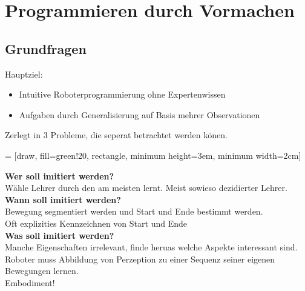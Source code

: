 

\section{Programmieren durch Vormachen}

\subsection{Grundfragen}
Hauptziel:
\begin{itemize}
\item Intuitive Roboterprogrammierung ohne Expertenwissen
\item Aufgaben durch Generalisierung auf Basis mehrer Observationen
\end{itemize}

Zerlegt in 3 Probleme, die seperat betrachtet werden könen.


 = [draw, fill=green!20, rectangle, 
minimum height=3em, minimum width=2cm]
\begin{figure}[!h]
  \centering
\end{figure}

\textbf{Wer soll imitiert werden?}\\
Wähle Lehrer durch den am meisten lernt. Meist sowieso dezidierter Lehrer.\\

\textbf{Wann soll imitiert werden?}\\
Bewegung segmentiert werden und Start und Ende bestimmt werden.\\
Oft explizities Kennzeichnen von Start und Ende\\

\textbf{Was soll imitiert werden?}\\
Manche Eigenschaften irrelevant, finde heruas welche Aspekte interessant sind.\\

Roboter muss Abbildung von Perzeption zu einer Sequenz seiner eigenen Bewegungen lernen.\\
Embodiment!


